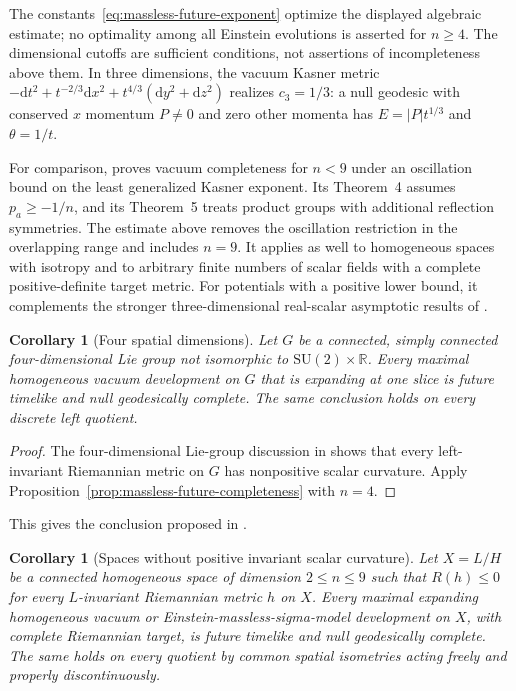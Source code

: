 \documentclass[10pt,a4paper]{article}
\numberwithin{equation}{section}
\newtheorem{corollary}[theorem]{Corollary}
\theoremstyle{definition}
\theoremstyle{remark}
\newcommand{\dd}{\mathrm d}
\begin{document}
The constants~\eqref{eq:massless-future-exponent} optimize the
displayed algebraic estimate; no optimality among all Einstein
evolutions is asserted for $n\ge4$.  The dimensional cutoffs are
sufficient conditions, not assertions of incompleteness above them.
In three dimensions, the vacuum Kasner metric
$-\dd t^2+t^{-2/3}\dd x^2+t^{4/3}(\dd y^2+\dd z^2)$ realizes
$c_3=1/3$: a null geodesic with conserved $x$ momentum $P\ne0$
and zero other momenta has $E=|P|t^{1/3}$ and $\theta=1/t$.

For comparison, \cite[Theorem~3]{GoedekeRendall2010} proves vacuum
completeness for $n<9$ under an oscillation bound on the least
generalized Kasner exponent.  Its Theorem~4 assumes $p_a\ge-1/n$,
and its Theorem~5 treats product groups with additional reflection
symmetries.  The estimate above removes the oscillation restriction
in the overlapping range and includes $n=9$.  It applies as well
to homogeneous spaces with isotropy and to arbitrary finite numbers
of scalar fields with a complete positive-definite target metric.
For potentials with a positive lower bound, it complements the
stronger three-dimensional real-scalar asymptotic results of
\cite[Theorems~1-2]{Rendall2004Scalar}.

\begin{corollary}[Four spatial dimensions]\label{cor:four-spatial-vacuum}
Let $G$ be a connected, simply connected four-dimensional Lie group
not isomorphic to $\mathrm{SU}(2)\times\mathbb R$.
Every maximal homogeneous vacuum development on $G$ that is
expanding at one slice is future timelike and null geodesically
complete.  The same conclusion holds on every discrete left quotient.
\end{corollary}

\begin{proof}
The four-dimensional Lie-group discussion in
\cite[Section~5]{GoedekeRendall2010} shows that every left-invariant
Riemannian metric on $G$ has nonpositive scalar curvature.
Apply Proposition~\ref{prop:massless-future-completeness} with $n=4$.
\end{proof}

This gives the conclusion proposed in
\cite[Section~5]{GoedekeRendall2010}.

\begin{corollary}[Spaces without positive invariant scalar curvature]
\label{cor:structural-homogeneous-future}
Let $X=L/H$ be a connected homogeneous space of dimension
$2\le n\le9$ such that $R(h)\le0$ for every $L$-invariant Riemannian
metric $h$ on $X$.  Every maximal expanding homogeneous vacuum or
Einstein-massless-sigma-model development on $X$, with complete
Riemannian target, is future timelike and null geodesically complete.
The same holds on every quotient by common spatial isometries acting
freely and properly discontinuously.
\end{corollary}
\end{document}
